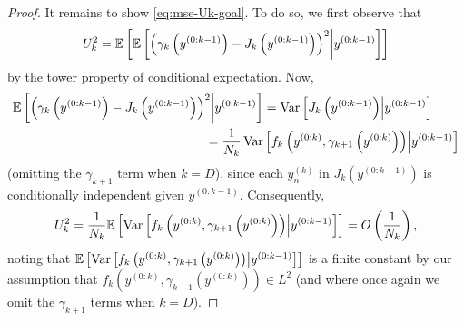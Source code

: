 \begin{proof}
  It remains to show \eqref{eq:mse-Uk-goal}. To do so, we first observe that
  \[
    U_k^2 = \mathbb{E}\left[ \mathbb{E}\left[ \left(\gamma_k\left(y^{(0:k-1)}\right) - J_k\left(y^{(0:k-1)}\right)\right)^2 \middle| y^{(0:k-1)} \right] \right]
  \]
  by the tower property of conditional expectation. Now, 
  \begin{align*}
    \mathbb{E}\left[ \left(\gamma_k\left(y^{(0:k-1)}\right) - J_k\left(y^{(0:k-1)}\right)\right)^2 \middle| y^{(0:k-1)} \right]
    &= \operatorname*{Var} \left[J_k\left(y^{(0:k-1)}\right) \middle| y^{(0:k-1)} \right] \\
    = \frac{1}{N_k} \operatorname*{Var} &\left[f_k\left(y^{(0:k)}, \gamma_{k+1}\left(y^{(0:k)}\right)\right) \middle| y^{(0:k-1)} \right]
  \end{align*}
  (omitting the $\gamma_{k+1}$ term when $k = D$), since each $y^{(k)}_n$ in
  $J_k\left(y^{(0:k-1)}\right)$ is conditionally independent given $y^{(0:k-1)}$.
  Consequently,
  \[
    U_k^2 = \frac{1}{N_k} \mathbb{E} \left[ \operatorname*{Var} \left[f_k\left(y^{(0:k)}, \gamma_{k+1}\left(y^{(0:k)}\right)\right) \middle| y^{(0:k-1)} \right] \right]
    = O\left(\frac{1}{N_k}\right),
  \]
  noting that $\mathbb{E} \left[ \operatorname*{Var} \left[f_k\left(y^{(0:k)},
  \gamma_{k+1}\left(y^{(0:k)}\right)\right) \middle| y^{(0:k-1)} \right] \right]$ is a
  finite constant by our assumption that $f_k\left(y^{(0:k)},
  \gamma_{k+1}\left(y^{(0:k)}\right)\right) \in L^2$ (and where once again we omit the
  $\gamma_{k+1}$ terms when $k = D$).
\end{proof}


